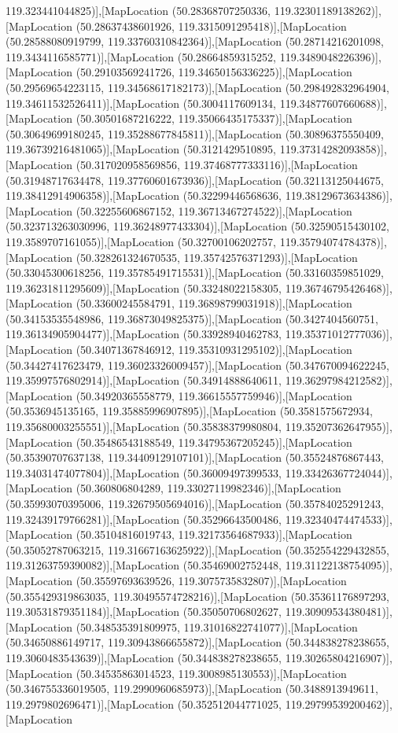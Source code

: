 119.323441044825)],[MapLocation (50.28368707250336, 119.32301189138262)],[MapLocation (50.28637438601926, 119.3315091295418)],[MapLocation (50.28588080919799, 119.33760310842364)],[MapLocation (50.28714216201098, 119.3434116585771)],[MapLocation (50.28664859315252, 119.3489048226396)],[MapLocation (50.29103569241726, 119.34650156336225)],[MapLocation (50.29569654223115, 119.34568617182173)],[MapLocation (50.298492832964904, 119.34611532526411)],[MapLocation (50.3004117609134, 119.34877607660688)],[MapLocation (50.30501687216222, 119.35066435175337)],[MapLocation (50.30649699180245, 119.35288677845811)],[MapLocation (50.30896375550409, 119.36739216481065)],[MapLocation (50.3121429510895, 119.37314282093858)],[MapLocation (50.317020958569856, 119.37468777333116)],[MapLocation (50.31948717634478, 119.37760601673936)],[MapLocation (50.32113125044675, 119.38412914906358)],[MapLocation (50.32299446568636, 119.38129673634386)],[MapLocation (50.32255606867152, 119.36713467274522)],[MapLocation (50.323713263030996, 119.36248977433304)],[MapLocation (50.32590515430102, 119.3589707161055)],[MapLocation (50.32700106202757, 119.35794074784378)],[MapLocation (50.328261324670535, 119.35742576371293)],[MapLocation (50.33045300618256, 119.35785491715531)],[MapLocation (50.33160359851029, 119.36231811295609)],[MapLocation (50.33248022158305, 119.36746795426468)],[MapLocation (50.33600245584791, 119.36898799031918)],[MapLocation (50.34153535548986, 119.36873049825375)],[MapLocation (50.3427404560751, 119.36134905904477)],[MapLocation (50.33928940462783, 119.35371012777036)],[MapLocation (50.34071367846912, 119.35310931295102)],[MapLocation (50.34427417623479, 119.36023326009457)],[MapLocation (50.347670094622245, 119.35997576802914)],[MapLocation (50.34914888640611, 119.36297984212582)],[MapLocation (50.34920365558779, 119.36615557759946)],[MapLocation (50.3536945135165, 119.35885996907895)],[MapLocation (50.3581575672934, 119.35680003255551)],[MapLocation (50.35838379980804, 119.35207362647955)],[MapLocation (50.35486543188549, 119.34795367205245)],[MapLocation (50.35390707637138, 119.34409129107101)],[MapLocation (50.35524876867443, 119.34031474077804)],[MapLocation (50.36009497399533, 119.33426367724044)],[MapLocation (50.360806804289, 119.33027119982346)],[MapLocation (50.35993070395006, 119.32679505694016)],[MapLocation (50.35784025291243, 119.32439179766281)],[MapLocation (50.35296643500486, 119.32340474474533)],[MapLocation (50.35104816019743, 119.32173564687933)],[MapLocation (50.35052787063215, 119.31667163625922)],[MapLocation (50.352554229432855, 119.31263759390082)],[MapLocation (50.35469002752448, 119.31122138754095)],[MapLocation (50.35597693639526, 119.3075735832807)],[MapLocation (50.355429319863035, 119.30495574728216)],[MapLocation (50.35361176897293, 119.30531879351184)],[MapLocation (50.35050706802627, 119.30909534380481)],[MapLocation (50.348535391809975, 119.31016822741077)],[MapLocation (50.34650886149717, 119.30943866655872)],[MapLocation (50.344838278238655, 119.3060483543639)],[MapLocation (50.344838278238655, 119.30265804216907)],[MapLocation (50.34535863014523, 119.3008985130553)],[MapLocation (50.346755336019505, 119.2990960685973)],[MapLocation (50.3488913949611, 119.2979802696471)],[MapLocation (50.352512044771025, 119.29799539200462)],[MapLocation 